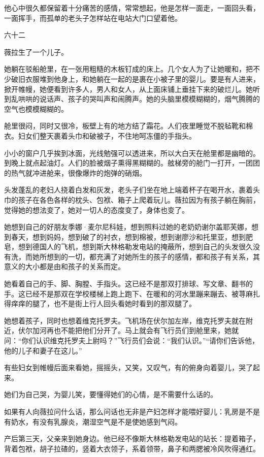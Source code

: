 他心中很久都保留着十分痛苦的感情，常常想起，他是怎样一面走，一面回头看，一面挥手，而孤单的老头子怎样站在电站大门口望着他。

六十二

薇拉生了一个儿子。

她躺在驳船舱里，在一张用粗糙的木板钉成的床上。几个女人为了让她暖和，把不少破旧衣服堆到他身上，和她躺在一起的是裹在小被子里的婴儿。要是有人进来，掀开帷幔，她便看到许多人，男人和女人，从上面床铺上垂挂下来的破烂儿。她听到乱哄哄的说话声、孩子的哭叫声和闹腾声。她的头脑里模模糊糊的，烟气腾腾的空气也模模糊糊的。

舱里很闷，同时又很冷，板壁上有的地方结了霜花。人们夜里睡觉不脱毡靴和棉衣。妇女们整天裹着头巾和破被子，不住地呵冻僵的手指头。

小小的窗户几乎挨到冰面，光线勉强可以透进来，所以大白天在舱里都是幽暗的。到晚上就点起油灯。人们的脸被烟子熏得黑糊糊的。舷梯旁的舱门一打开，一团团的热气就冲进舱来，很像爆炸的炮弹的硝烟。

头发蓬乱的老妇人挠着白发和灰发，老头子们坐在地上端着杯子在喝开水，裹着头巾的孩子在各色各样的枕头、包袱、箱子上爬着玩儿。薇拉因为有孩子躺在胸前，觉得她的想法变了，她对一切人的态度变了，身体也变了。

她想到自己的好朋友季娜·麦尔尼科娃，想到照料过她的老奶奶谢尔盖耶芙娜，想到春天，想到妈妈，想到破了的衬衣，想到棉被，想到谢廖沙和托里亚，想到肥皂，想到德国人的飞机，想到斯大林格勒发电站的掩蔽所，想到自己的头发很久没有洗，而她所想到的一切，都充满了对她所生的孩子的感情，都和孩子有关系，其意义的大小都是由和孩子的关系而定。

她看着自己的手、脚、胸膛、手指头。这已经不是那双打排球、写文章、翻书的手。这已经不是那双在学校楼梯上跑上跑下、在暖和的河水里蹦来蹦去、被荨麻扎得痒痒的腿了，也不是街上行人回头看她时看到的那双腿了。

她想着孩子，同时也想着维克托罗夫。飞机场在伏尔加左岸，维克托罗夫就在附近，伏尔加河再也不能把他们分开了。马上就会有飞行员们到舱里来，她就问：“你们认识维克托罗夫上尉吗？”飞行员们会说：“我们认识。”“请你们告诉他，他的儿子和妻子在这儿。”

有些妇女到帷幔后面来看她，摇摇头，又笑，又叹气，有的俯身向着婴儿，哭了起来。

她们为自己哭，为婴儿笑，要懂得她们的心情，是不需要什么话的。

如果有人向薇拉问什么话，那么问话也无非是产妇怎样才能喂好婴儿：乳房是不是有奶水，有没有乳腺炎，潮湿空气是不是使她感到气闷。

产后第三天，父亲来到她身边。他已经不像斯大林格勒发电站的站长：提着箱子，背着包袱，胡子拉碴的，竖着大衣领子，系着领带，鼻子和两腮被冷风吹得通红。

